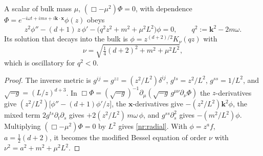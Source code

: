 \begin{nrprop}\label{nr:prop-schscalar}
A scalar of bulk mass $\mu$, $(\Box-\mu^2)\Phi=0$, with dependence
$\Phi=e^{-i\omega t+ims+i\mathbf{k}\cdot\mathbf{x}}\phi(z)$ obeys
\begin{equation}
  z^2\phi''-(d+1)\,z\,\phi'-\bigl(q^2z^2+m^2+\mu^2L^2\bigr)\phi=0,
  \qquad q^2:=\mathbf{k}^2-2m\omega .
  \label{nr:radial}
\end{equation}
Its solution that decays into the bulk is $\phi=z^{(d+2)/2}K_\nu(qz)$ with
\begin{equation}
  \nu=\sqrt{\tfrac14(d+2)^2+m^2+\mu^2L^2},
  \label{nr:nu}
\end{equation}
which is oscillatory for $q^2<0$.
\end{nrprop}
\begin{proof}
The inverse metric is $g^{ij}=g^{zz}=(z^2/L^2)\delta^{ij}$, $g^{ts}=z^2/L^2$,
$g^{ss}=1/L^2$, and $\sqrt{-g}=(L/z)^{d+3}$. In
$\Box\Phi=(\sqrt{-g})^{-1}\partial_\mu(\sqrt{-g}\,g^{\mu\nu}\partial_\nu\Phi)$
the $z$-derivatives give $(z^2/L^2)\bigl[\phi''-(d+1)\phi'/z\bigr]$, the $\mathbf{x}$-derivatives
give $-(z^2/L^2)\mathbf{k}^2\phi$, the mixed term $2g^{ts}\partial_t\partial_s$ gives
$+2(z^2/L^2)\,m\omega\,\phi$, and $g^{ss}\partial_s^2$ gives $-(m^2/L^2)\phi$.
Multiplying $(\Box-\mu^2)\Phi=0$ by $L^2$ gives \eqref{nr:radial}. With
$\phi=z^{a}f$, $a=\tfrac12(d+2)$, it becomes the modified Bessel equation of order
$\nu$ with $\nu^2=a^2+m^2+\mu^2L^2$.
\end{proof}

